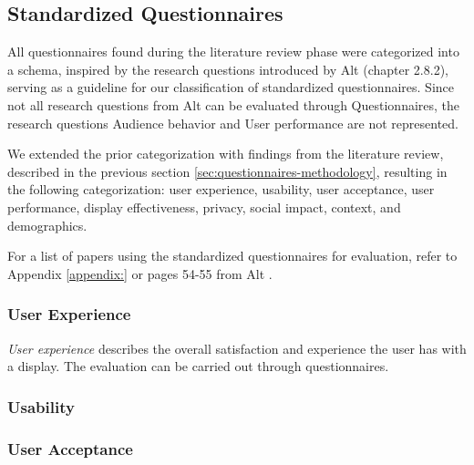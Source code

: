 




\subsection{Standardized Questionnaires}



	All questionnaires found during the literature review phase were categorized into a schema, inspired by the research questions introduced by Alt \cite{alt2013thesis} (chapter 2.8.2), serving as a guideline for our classification of standardized questionnaires. Since not all research questions from Alt can be evaluated through Questionnaires, the research questions Audience behavior and User performance are not represented.

	We extended the prior categorization with findings from the literature review, described in the previous section \ref{sec:questionnaires-methodology}, resulting in the following categorization: user experience, usability, user acceptance, user performance, display effectiveness, privacy, social impact, context, and demographics.


	For a list of papers using the standardized questionnaires for evaluation, refer to Appendix \ref{appendix:} or pages 54-55 from Alt \cite{alt2013thesis}.



	\subsubsection{User Experience}

		\textit{User experience} describes the overall satisfaction and experience the user has with a display. The evaluation can be carried out through questionnaires.
	
	\subsubsection{Usability}

	\subsubsection{User Acceptance}

